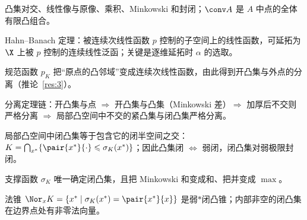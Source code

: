 \begin{keypoints}
  \item 凸集对交、线性像与原像、乘积、Minkowski 和封闭；$\conv A$ 是 $A$ 中点的全体有限凸组合。
  \item Hahn--Banach 定理：被连续次线性函数 $p$ 控制的子空间上的线性函数，可延拓为 $\X$ 上被 $p$ 控制的连续线性泛函；关键是逐维延拓时 $\alpha$ 的选取。
  \item 规范函数 $p_K$ 把“原点的凸邻域”变成连续次线性函数，由此得到开凸集与外点的分离（推论~\ref{res:3}）。
  \item 分离定理链：开凸集与点 $\Rightarrow$ 开凸集与凸集（Minkowski 差）$\Rightarrow$ 加厚后不交则严格分离 $\Rightarrow$ 局部凸空间中不交的紧凸集与闭凸集严格分离。
  \item 局部凸空间中闭凸集等于包含它的闭半空间之交：$K=\bigcap_{x^*}\{\pair{x^*}{\cdot}\leqslant\sigma_K(x^*)\}$；因此凸集闭 $\iff$ 弱闭，闭凸集对弱极限封闭。
  \item 支撑函数 $\sigma_K$ 唯一确定闭凸集，且把 Minkowski 和变成和、把并变成 $\max$。
  \item 法锥 $\Nor_xK=\{x^*\mid\sigma_K(x^*)=\pair{x^*}{x}\}$ 是弱$*$闭凸锥；内部非空的闭凸集在边界点处有非零法向量。
\end{keypoints}
